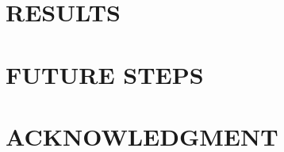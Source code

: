 \documentclass[letterpaper, 10 pt, conference]{ieeeconf}  %
\begin{document}
\section{RESULTS}

\section{FUTURE STEPS}


\addtolength{\textheight}{-12cm}   %







\section*{ACKNOWLEDGMENT}



\begin{thebibliography}{99}

\end{thebibliography}
\end{document}
